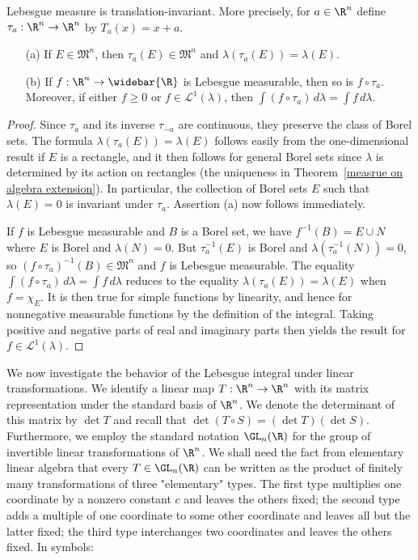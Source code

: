 \begin{theorem}\label{measure Lebesgue invariance translation}
Lebesgue measure is translation-invariant. More precisely, for $a\in\R^n$ define $\tau_a:\R^n\to\R^n$ by $T_a(x)=x+a$.
\begin{itemize}
\item[(a)] If $E\in\mathfrak{M}^n$, then $\tau_a(E)\in\mathfrak{M}^n$ and $\lambda(\tau_a(E))=\lambda(E)$.
\item[(b)] If $f:\R^n\to\widebar{\R}$ is Lebesgue measurable, then so is $f\circ\tau_a$. Moreover, if either $f\geq 0$ or $f\in\mathcal{L}^1(\lambda)$, then $\int(f\circ\tau_a)\,d\lambda=\int f\,d\lambda$.
\end{itemize}
\end{theorem}
\begin{proof}
Since $\tau_a$ and its inverse $\tau_{-a}$ are continuous, they preserve the class of Borel sets. The formula $\lambda(\tau_a(E))=\lambda(E)$ follows easily from the one-dimensional result if $E$ is a rectangle, and it then follows for general Borel sets since $\lambda$ is determined by its action on rectangles (the uniqueness in Theorem~\ref{measrue on algebra extension}). In particular, the collection of Borel sets $E$ such that $\lambda(E)=0$ is invariant under $\tau_a$. Assertion (a) now follows immediately.\par
If $f$ is Lebesgue measurable and $B$ is a Borel set, we have $f^{-1}(B)=E\cup N$ where $E$ is Borel and $\lambda(N)=0$. But $\tau_a^{-1}(E)$ is Borel and $\lambda(\tau_a^{-1}(N))=0$, so $(f\circ\tau_a)^{-1}(B)\in\mathfrak{M}^n$ and $f$ is Lebesgue measurable. The equality $\int(f\circ\tau_a)\,d\lambda=\int f\,d\lambda$ reduces to the equality $\lambda(\tau_a(E))=\lambda(E)$ when $f=\chi_E$. It is then true for simple functions by linearity, and hence for nonnegative measurable functions by the definition of the integral. Taking positive and negative parts of real and imaginary parts then yields the result for $f\in\mathcal{L}^1(\lambda)$.
\end{proof}
We now investigate the behavior of the Lebesgue integral under linear transformations. We identify a linear map $T:\R^n\to\R^n$ with its matrix representation under the standard basis of $\R^n$. We denote the determinant of this matrix by $\det T$ and recall that $\det(T\circ S)=(\det T)(\det S)$. Furthermore, we employ the standard notation $\GL_n(\R)$ for the group of invertible linear transformations of $\R^n$. We shall need the fact from elementary linear algebra that every $T\in\GL_n(\R)$ can be written as the product of finitely many transformations of three "elementary" types. The first type multiplies one coordinate by a nonzero constant $c$ and leaves the others fixed; the second type adds a multiple of one coordinate to some other coordinate and leaves all but the latter fixed; the third type interchanges two coordinates and leaves the others fixed. In symbols:
